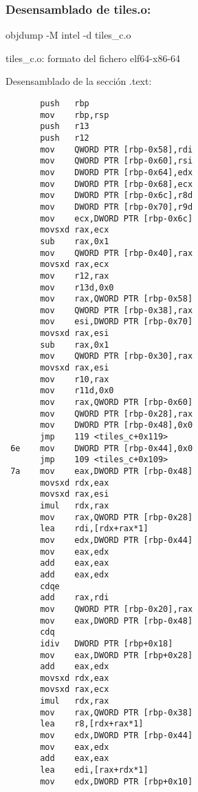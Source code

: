 \subsubsection{Desensamblado de tiles.o:}
objdump -M intel -d tiles_c.o

tiles_c.o:     formato del fichero elf64-x86-64

Desensamblado de la sección .text:

\begin{codesnippet}
\begin{verbatim}
       push   rbp
       mov    rbp,rsp
       push   r13
       push   r12
       mov    QWORD PTR [rbp-0x58],rdi
       mov    QWORD PTR [rbp-0x60],rsi
       mov    DWORD PTR [rbp-0x64],edx
       mov    DWORD PTR [rbp-0x68],ecx
       mov    DWORD PTR [rbp-0x6c],r8d
       mov    DWORD PTR [rbp-0x70],r9d
       mov    ecx,DWORD PTR [rbp-0x6c]
       movsxd rax,ecx
       sub    rax,0x1
       mov    QWORD PTR [rbp-0x40],rax
       movsxd rax,ecx
       mov    r12,rax
       mov    r13d,0x0
       mov    rax,QWORD PTR [rbp-0x58]
       mov    QWORD PTR [rbp-0x38],rax
       mov    esi,DWORD PTR [rbp-0x70]
       movsxd rax,esi
       sub    rax,0x1
       mov    QWORD PTR [rbp-0x30],rax
       movsxd rax,esi
       mov    r10,rax
       mov    r11d,0x0
       mov    rax,QWORD PTR [rbp-0x60]
       mov    QWORD PTR [rbp-0x28],rax
       mov    DWORD PTR [rbp-0x48],0x0
       jmp    119 <tiles_c+0x119>
 6e    mov    DWORD PTR [rbp-0x44],0x0
       jmp    109 <tiles_c+0x109>
 7a    mov    eax,DWORD PTR [rbp-0x48]
       movsxd rdx,eax
       movsxd rax,esi
       imul   rdx,rax
       mov    rax,QWORD PTR [rbp-0x28]
       lea    rdi,[rdx+rax*1]
       mov    edx,DWORD PTR [rbp-0x44]
       mov    eax,edx
       add    eax,eax
       add    eax,edx
       cdqe   
       add    rax,rdi
       mov    QWORD PTR [rbp-0x20],rax
       mov    eax,DWORD PTR [rbp-0x48]
       cdq    
       idiv   DWORD PTR [rbp+0x18]
       mov    eax,DWORD PTR [rbp+0x28]
       add    eax,edx
       movsxd rdx,eax
       movsxd rax,ecx
       imul   rdx,rax
       mov    rax,QWORD PTR [rbp-0x38]
       lea    r8,[rdx+rax*1]
       mov    edx,DWORD PTR [rbp-0x44]
       mov    eax,edx
       add    eax,eax
       lea    edi,[rax+rdx*1]
       mov    edx,DWORD PTR [rbp+0x10]
\end{verbatim}
\end{codesnippet}
